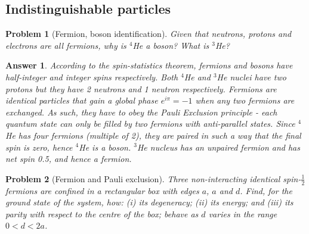 \documentclass[a4paper]{article}
\newtheorem{ans}{Answer}[section]
\theoremstyle{new}
\newtheorem{qns}{Problem}[section]
\begin{document}
\subsection*{Indistinguishable particles}
\begin{qns}[Fermion, boson identification]
Given that neutrons, protons and electrons are all fermions, why is $^4$He a boson? What is $^3$He?
\end{qns}
\begin{ans}
According to the spin-statistics theorem, fermions and bosons have half-integer and integer spins respectively. Both $^4$He and $^3$He nuclei have two protons but they have 2 neutrons and 1 neutron respectively. Fermions are identical particles that gain a global phase $e^{i\pi}=-1$ when any two fermions are exchanged. As such, they have to obey the Pauli Exclusion principle - each quantum state can only be filled by two fermions with anti-parallel states. Since $^4$He has four fermions (multiple of 2), they are paired in such a way that the final spin is zero, hence $^4$He is a boson. $^3$He nucleus has an unpaired fermion and has net spin 0.5, and hence a fermion.
\end{ans}
\newpage
\begin{qns}[Fermion and Pauli exclusion]
Three non-interacting identical spin-$\frac{1}{2}$ fermions are confined in a rectangular box with edges $a$, $a$ and $d$. Find, for the ground state of the system, how: (i) its degeneracy; (ii) its energy; and (iii) its parity with respect to the centre of the box; behave as $d$ varies in the range $0 < d < 2a$.
\end{qns}
\end{document}
